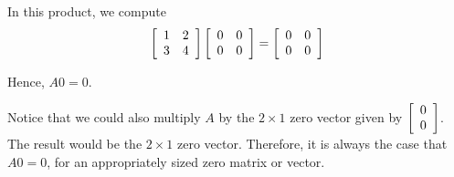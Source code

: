 \begin{solution} 
In this product, we compute
\begin{equation*}
\left[
\begin{array}{rr}
1 & 2 \\
3 & 4
\end{array}
\right]
\left[
\begin{array}{rr}
0 & 0 \\
0 & 0
\end{array}
\right]
=
\left[
\begin{array}{rr}
0 & 0 \\
0 & 0
\end{array}
\right]
\end{equation*}

Hence, $A0=0$. 
\end{solution}

Notice that we could also multiply $A$ by the $2 \times 1 $ zero vector given by $\left[
\begin{array}{r}
0 \\
0
\end{array}
\right]$.
The result would be the $2 \times 1$ zero vector. 
Therefore, it is always the case that $A0=0$, for an appropriately sized zero matrix or vector. 